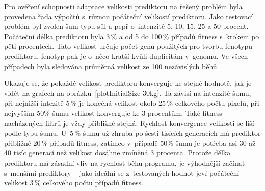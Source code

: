 Pro ověření schopnosti adaptace velikosti prediktoru na řešený problém byla provedena řada výpočtů s~různou počáteční velikostí prediktoru. Jako testovací problém byl zvolen šum typu sůl a pepř o~intenzitě 5, 10, 15, 25 a 50 procent. Počáteční délka prediktoru byla 3\,\% a od 5 do 100\,\% případů fitness s~krokem po pěti procentech. Tato velikost určuje počet genů použitých pro tvorbu fenotypu prediktoru, fenotyp pak je o~něco kratší kvůli duplicitám v~genomu. Ve všech případech byla sledována průměrná velikost ze 100 nezávislých běhů.

Ukazuje se, že pokaždé velikost prediktoru konverguje ke stejné hodnotě, jak je vidět na grafech na obrázku~\ref{plotInitialSize-30kg}. Ta závisí na intenzitě šumu, při nejnižší intezitě 5\,\% je konečná velikost okolo 25\,\% celkového počtu pixelů, při nejvyšším 50\% šumu velikost konverguje ke 3 procentům. Také fitness nacházených filtrů je vždy přibližně stejná. Rychlost konvergence velikosti se liší podle typu šumu. U~5\,\% šumu už zhruba po šesti tisících generacích má prediktor přibližně 20\,\% případů fitness, zatímco v~případě 50\% šumu je potřeba asi 30 až 40 tisíc generací než velikost dosáhne zmíněná 3 procenta. Protože délka prediktoru má zásadní vliv na rychlost běhu programu, je výhodnější začínat s~menšími prediktory -- jako ideální se z~testovaných hodnot jeví počáteční velikost 3\,\% celkového počtu případů fitness.

